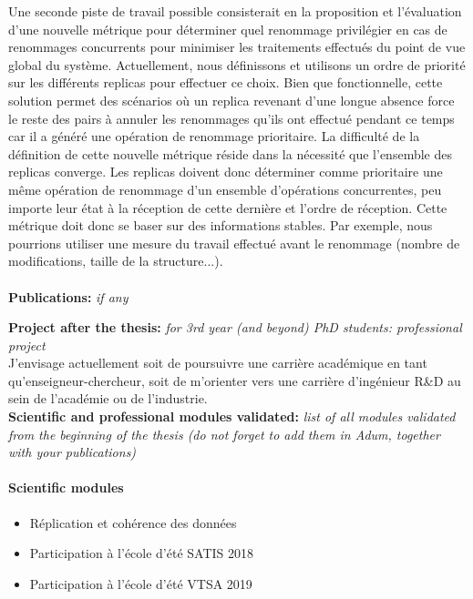 \documentclass[12pt]{article}
\newcommand{\commentaire}[1]{\small\textit{#1}}
\begin{document}
Une seconde piste de travail possible consisterait en la proposition et l'évaluation d'une nouvelle métrique pour déterminer quel renommage privilégier en cas de renommages concurrents pour minimiser les traitements effectués du point de vue global du système.
Actuellement, nous définissons et utilisons un ordre de priorité sur les différents replicas pour effectuer ce choix.
Bien que fonctionnelle, cette solution permet des scénarios où un replica revenant d'une longue absence force le reste des pairs à annuler les renommages qu'ils ont effectué pendant ce temps car il a généré une opération de renommage prioritaire.
La difficulté de la définition de cette nouvelle métrique réside dans la nécessité que l'ensemble des replicas converge.
Les replicas doivent donc déterminer comme prioritaire une même opération de renommage d'un ensemble d'opérations concurrentes, peu importe leur état à la réception de cette dernière et l'ordre de réception.
Cette métrique doit donc se baser sur des informations stables.
Par exemple, nous pourrions utiliser une mesure du travail effectué avant le renommage (nombre de modifications, taille de la structure...).
\\

\\

\noindent\textbf{Publications:}
\commentaire{%
  if any\\}


\nocite{*}

\noindent\textbf{Project after the thesis:}
\commentaire{%
  for 3rd year (and beyond) PhD students: professional project\\}
J'envisage actuellement soit de poursuivre une carrière académique en tant qu'enseigneur-chercheur, soit de m'orienter vers une carrière d'ingénieur R\&D au sein de l'académie ou de l'industrie.
\\

\noindent\textbf{Scientific and professional modules validated:}
\commentaire{%
  list of all modules validated from the beginning of the thesis (do
  not forget to add them in Adum, together with your publications)}
\paragraph{\footnotesize Scientific modules}
  \begin{itemize}
      \itemsep0em
      \item Réplication et cohérence des données
      \item Participation à l'école d'été SATIS 2018
      \item Participation à l'école d'été VTSA 2019
  \end{itemize}
\end{document}
